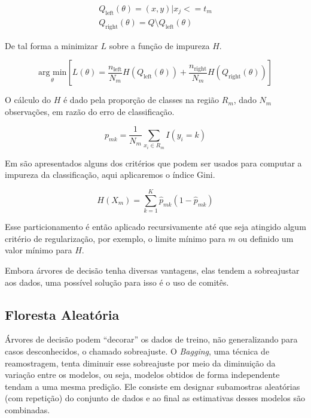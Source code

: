 \begin{equation}
        \begin{aligned}
            Q_{\text{left}}(\theta) = {(x, y) | x_j <= t_m}\\
            Q_{\text{right}}(\theta) = Q \setminus Q_{\text{left}}(\theta)
        \end{aligned}
    \label{eq:splitc}
\end{equation}

De tal forma a minimizar $L$ sobre a função de
impureza $H$.

\begin{equation}
    \underset{\theta}{\text{arg min}} \left[ L(\theta) =  \frac{n_{\text{left}}}{N_m} H(Q_{\text{left}}(\theta)) +
    \frac{n_{\text{right}}}{N_m} H(Q_{\text{right}}(\theta)) \right]
    \label{eq:treegreed}
\end{equation}

O cálculo do $H$ é dado pela proporção de classes na região $R_m$,
dado $N_m$ observações, em razão do erro de classificação.

\begin{equation}
    p_{mk} = \frac{1}{N_m} \sum_{x_i \in R_m} I(y_i = k)
\end{equation}

Em \cite{friedman2001elements} são apresentados alguns dos critérios que podem
ser usados para computar a impureza da classificação, aqui aplicaremos o índice
Gini.

\begin{equation}
    H(X_m) = \sum_{k=1}^{K} \hat{p}_{mk}(1 - \hat{p}_{mk})
    \label{eq:gini}
\end{equation}

Esse particionamento é então aplicado recursivamente até que seja atingido
algum critério de regularização, por exemplo, o limite mínimo para $m$ ou
definido um valor mínimo para $H$.

Embora árvores de decisão tenha diversas vantagens, elas tendem a sobreajustar
aos dados, uma possível solução para isso é o uso de comitês.

\subsection{Floresta Aleatória}

Árvores de decisão podem ``decorar'' os dados de treino, não generalizando para
casos desconhecidos, o chamado sobreajuste. O \textit{Bagging}, uma técnica de
reamostragem, tenta diminuir esse sobreajuste por meio da diminuição da
variação entre os modelos, ou seja, modelos obtidos de forma independente
tendam a uma mesma predição. Ele consiste em designar subamostras aleatórias
(com repetição) do conjunto de dados e ao final as estimativas desses modelos
são combinadas.


